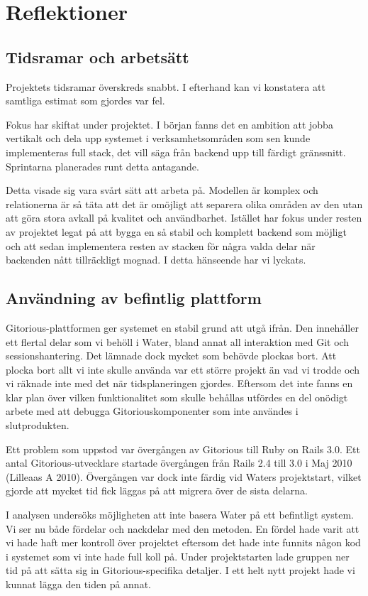 \section{Reflektioner}

\subsection{Tidsramar och arbetsätt}
Projektets tidsramar överskreds snabbt. I efterhand kan vi konstatera att samtliga estimat som gjordes var fel.

Fokus har skiftat under projektet. I början fanns det en ambition att jobba vertikalt och dela upp systemet i verksamhetsområden som sen kunde implementeras full stack, det vill säga från backend upp till färdigt gränssnitt. Sprintarna planerades runt detta antagande.

Detta visade sig vara svårt sätt att arbeta på. Modellen är komplex och relationerna är så täta att det är omöjligt att separera olika områden av den utan att göra stora avkall på kvalitet och användbarhet. Istället har fokus under resten av projektet legat på att bygga en så stabil och komplett backend som möjligt och att sedan implementera resten av stacken för några valda delar när backenden nått tillräckligt mognad. I detta hänseende har vi lyckats.

\subsection{Användning av befintlig plattform}
Gitorious-plattformen ger systemet en stabil grund att utgå ifrån. Den innehåller ett flertal delar som vi behöll i Water, bland annat all interaktion med Git och sessionshantering. Det lämnade dock mycket som behövde plockas bort. Att plocka bort allt vi inte skulle använda var ett större projekt än vad vi trodde och vi räknade inte med det när tidsplaneringen gjordes. Eftersom det inte fanns en klar plan över vilken funktionalitet som skulle behållas utfördes en del onödigt arbete med att debugga Gitoriouskomponenter som inte användes i slutprodukten.

Ett problem som uppstod var övergången av Gitorious till Ruby on Rails 3.0. Ett antal Gitorious-utvecklare startade övergången från Rails 2.4 till 3.0 i Maj 2010 (Lilleaas A 2010). Övergången var dock inte färdig vid Waters projektstart, vilket gjorde att mycket tid fick läggas på att migrera över de sista delarna.

I analysen undersöks möjligheten att inte basera Water på ett befintligt system. Vi ser nu både fördelar och nackdelar med den metoden. En fördel hade varit att vi hade haft mer kontroll över projektet eftersom det hade inte funnits någon kod i systemet som vi inte hade full koll på. Under projektstarten lade gruppen ner tid på att sätta sig in Gitorious-specifika detaljer. I ett helt nytt projekt hade vi kunnat lägga den tiden på annat.

